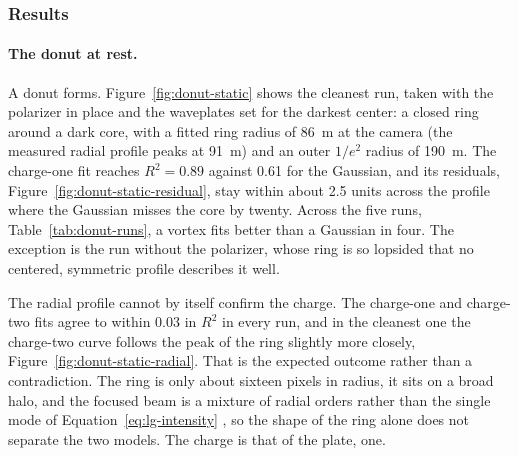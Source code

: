 \documentclass{article}
\begin{document}
\subsubsection{Results}

\paragraph{The donut at rest.}
A donut forms. Figure~\ref{fig:donut-static} shows the cleanest run, taken with the polarizer in
place and the waveplates set for the darkest center: a closed ring around a dark core, with a
fitted ring radius of 86~\textmu m at the camera (the measured radial profile peaks at
91~\textmu m) and an outer $1/e^2$ radius of
190~\textmu m. The charge-one fit reaches $R^2 = 0.89$ against 0.61 for the Gaussian, and its
residuals, Figure~\ref{fig:donut-static-residual}, stay within about 2.5 units across the profile
where the Gaussian misses the core by twenty. Across the five runs, Table~\ref{tab:donut-runs}, a
vortex fits better than a Gaussian in four. The exception is the run without the polarizer, whose
ring is so lopsided that no centered, symmetric profile describes it well.

The radial profile cannot by itself confirm the charge. The charge-one and charge-two fits agree to
within 0.03 in $R^2$ in every run, and in the cleanest one the charge-two curve follows the peak of
the ring slightly more closely, Figure~\ref{fig:donut-static-radial}. That is the expected outcome
rather than a contradiction. The ring is only about sixteen pixels in radius, it sits on a broad
halo, and the focused beam is a mixture of radial orders rather than the single mode of
Equation~\ref{eq:lg-intensity} \cite{karimiHypergeometricGaussianModes2007}, so the shape of the
ring alone does not separate the two models. The charge is that of the plate, one.
\end{document}
